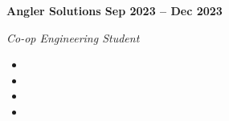 \vspace{0.1cm}
\textbf{Angler Solutions \hfill Sep 2023 -- Dec 2023} \par
\textit{Co-op Engineering Student} \par
\begin{itemize}
	\item
  \item 
  \item 
  \item 
\end{itemize} \par